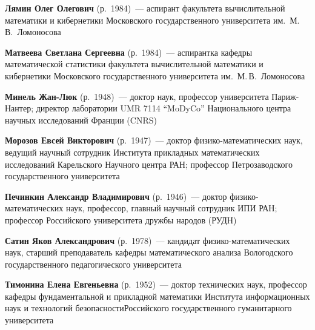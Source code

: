 \begin{multicols}{2}
\vspace*{3pt}

\noindent
\textbf{Лямин Олег Олегович} (р.\ 1984)~--- аспирант факультета вычислительной математики и кибернетики 
Московского государственного университета им.~М.\,В.~Ломоносова

\vspace*{3pt}

\noindent
\textbf{Матвеева Светлана Сергеевна} (р.\ 1984)~--- аспирантка кафедры математической статистики 
факультета вычислительной математики и кибернетики Московского государственного университета им.~М.\,В.~Ломоносова

\vspace*{3pt}

\noindent
\textbf{Минель Жан-Люк} (р.\ 1948)~--- доктор наук, профессор университета Париж-Нантер; 
директор лаборатории UMR 7114 ``MoDyCo'' Национального центра научных исследований Франции (CNRS)

\vspace*{3pt}

\noindent
\textbf{Морозов Евсей Викторович} (р.\  1947)~--- 
доктор физико-математических наук, ведущий научный сотрудник   
Института прикладных математических исследований Карельского Научного центра РАН;  
профессор Петрозаводского государственного университета

\vspace*{3pt}

\noindent
\textbf{Печинкин Александр Владимирович} (р.\ 1946)~--- доктор физико-математических наук, профессор, 
главный научный сотрудник ИПИ РАН; профессор Российского университета дружбы народов (РУДН) 

\vspace*{3pt}

\noindent
\textbf{Сатин Яков Александрович} (р.\ 1978)~--- кандидат
фи\-зи\-ко-математических наук, старший преподаватель кафедры
математического анализа Вологодского государственного
педагогического университета

\vspace*{3pt}

\noindent
\textbf{Тимонина Елена Евгеньевна} (р.\ 1952)~--- доктор технических наук, профессор кафедры фундаментальной 
и прикладной математики Института информационных наук и технологий безопасности\linebreak Российского государственного 
гуманитарного университета


\vspace*{3pt}


\end{multicols}
